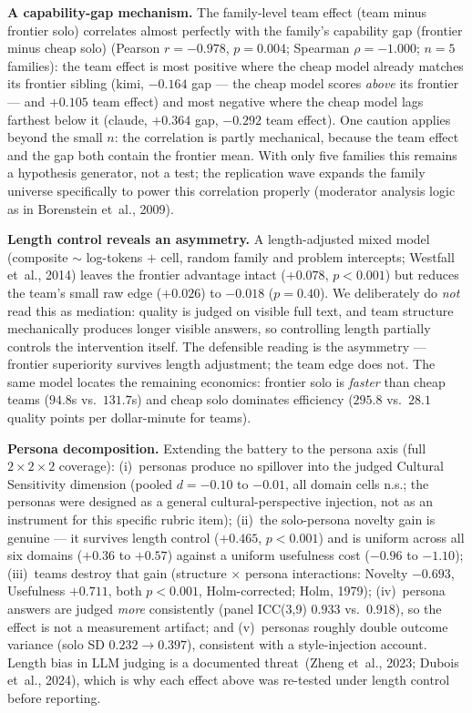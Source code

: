 \documentclass[12pt,a4paper]{article}
\begin{document}
\textbf{A capability-gap mechanism.} The family-level team effect (team minus
frontier solo) correlates almost perfectly with the family's capability gap
(frontier minus cheap solo)
(Pearson $r = -0.978$, $p = 0.004$; Spearman $\rho = -1.000$; $n = 5$
families): the team effect is most positive where the cheap model already
matches its frontier sibling (kimi, $-0.164$ gap --- the cheap model scores
\emph{above} its frontier --- and $+0.105$ team effect) and most negative
where the cheap model lags farthest below it (claude, $+0.364$ gap,
$-0.292$ team effect). One caution applies beyond the small $n$: the
correlation is partly mechanical, because the team effect and the gap both
contain the frontier mean. With only five families
this remains a hypothesis generator, not a test; the replication wave expands
the family universe specifically to power this correlation properly
(moderator analysis logic as in Borenstein et~al., 2009).

\textbf{Length control reveals an asymmetry.} A length-adjusted mixed model
(composite $\sim$ log-tokens $+$ cell, random family and problem intercepts;
Westfall et~al., 2014) leaves the frontier advantage intact ($+0.078$,
$p < 0.001$) but reduces the team's small raw edge ($+0.026$) to $-0.018$
($p = 0.40$). We deliberately do \emph{not} read this as mediation: quality is
judged on visible full text, and team structure mechanically produces longer
visible answers, so controlling length partially controls the intervention
itself. The defensible reading is the asymmetry --- frontier superiority
survives length adjustment; the team edge does not. The same model locates the
remaining economics: frontier solo is \emph{faster} than cheap teams ($94.8$s
vs.\ $131.7$s) and cheap solo dominates efficiency ($295.8$ vs.\ $28.1$
quality points per dollar-minute for teams).

\textbf{Persona decomposition.} Extending the battery to the persona axis
(full $2\times2\times2$ coverage): (i)~personas produce no spillover into the
judged Cultural Sensitivity dimension (pooled $d = -0.10$ to $-0.01$, all
domain cells n.s.; the personas were designed as a general cultural-perspective
injection, not as an instrument for this specific rubric item); (ii)~the
solo-persona novelty gain is genuine --- it survives length control
($+0.465$, $p < 0.001$) and is uniform across all six domains ($+0.36$ to
$+0.57$) against a uniform usefulness cost ($-0.96$ to $-1.10$); (iii)~teams
destroy that gain (structure $\times$ persona interactions: Novelty $-0.693$,
Usefulness $+0.711$, both $p < 0.001$, Holm-corrected; Holm, 1979);
(iv)~persona answers are judged \emph{more} consistently (panel ICC(3,9)
$0.933$ vs.\ $0.918$), so the effect is not a measurement artifact; and
(v)~personas roughly double outcome variance (solo SD $0.232 \to 0.397$),
consistent with a style-injection account. Length bias in LLM judging is a
documented threat~(Zheng et~al., 2023; Dubois et~al., 2024), which is why each
effect above was re-tested under length control before reporting.
\end{document}
